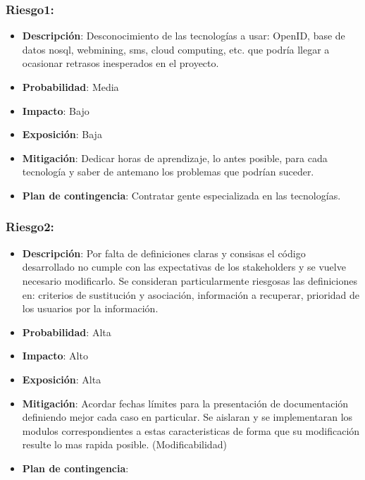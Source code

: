 \subsubsection{Riesgo1:}

\begin{itemize}
\itemsep1pt\parskip0pt
\item
  \textbf{Descripción}: Desconocimiento de las tecnologías a usar:
  OpenID, base de datos nosql, webmining, sms, cloud computing, etc. que
  podría llegar a ocasionar retrasos inesperados en el proyecto.
\item
  \textbf{Probabilidad}: Media
\item
  \textbf{Impacto}: Bajo
\item
  \textbf{Exposición}: Baja
\item
  \textbf{Mitigación}: Dedicar horas de aprendizaje, lo antes posible,
  para cada tecnología y saber de antemano los problemas que podrían
  suceder.
\item
  \textbf{Plan de contingencia}: Contratar gente especializada en las
  tecnologías.
\end{itemize}

\subsubsection{Riesgo2:}

\begin{itemize}
\itemsep1pt\parskip0pt
\item
  \textbf{Descripción}: Por falta de definiciones claras y consisas el
  código desarrollado no cumple con las expectativas de los stakeholders
  y se vuelve necesario modificarlo. Se consideran particularmente
  riesgosas las definiciones en: criterios de sustitución y asociación,
  información a recuperar, prioridad de los usuarios por la información.
\item
  \textbf{Probabilidad}: Alta
\item
  \textbf{Impacto}: Alto
\item
  \textbf{Exposición}: Alta
\item
  \textbf{Mitigación}: Acordar fechas límites para la presentación de
  documentación definiendo mejor cada caso en particular. Se aislaran y
  se implementaran los modulos correspondientes a estas caracteristicas
  de forma que su modificación resulte lo mas rapida posible.
  (Modificabilidad)
\item
  \textbf{Plan de contingencia}:
\end{itemize}

